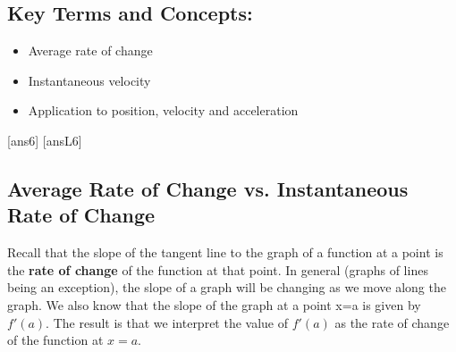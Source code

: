 \begin{framed}
\subsection*{Key Terms and Concepts:} 

\begin{multicols}{2}
\begin{itemize}
    \item Average rate of change
    \item Instantaneous velocity
    \item Application to position, velocity and acceleration
\end{itemize}
\end{multicols}
\end{framed}

\newpage
[ans6]
[ansL6]
\subsection*{Average Rate of Change vs. Instantaneous Rate of Change}
\noindent Recall that the slope of the tangent line to the graph of a function at a point is the \textbf{rate of change} of the function at that point.  In general (graphs of lines being an exception), the slope of a graph will be changing as we move along the graph.  We also know that the slope of the graph at a point x=a is given by $f'(a)$.  The result is that we interpret the value of $f'(a)$ as the rate of change of the function at $x=a$. \\ 


